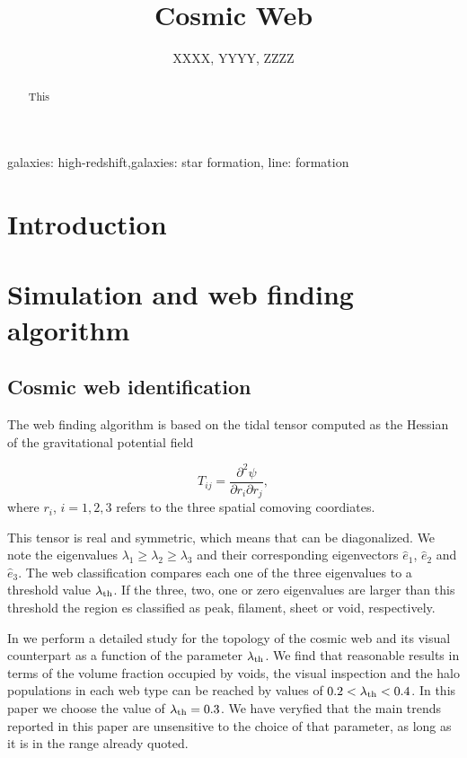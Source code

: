 \documentclass{emulateapj}
\begin{document}
\title{Cosmic Web} 
\author{
  XXXX,
  YYYY,
  ZZZZ
}

\begin{abstract}
This
\end{abstract}

\begin{keywords}
{galaxies: high-redshift,galaxies: star formation, line: formation}
\end{keywords}


\section{Introduction}
\label{sec:intro}

\section{Simulation and web finding algorithm}
\label{sec:Simulation}


\subsection{Cosmic web identification}
The web finding algorithm is based on the tidal tensor computed as the
Hessian of the  gravitational potential field

\begin{equation}
T_{ij} = \frac{\partial^2 \psi}{\partial r_i \partial r_j}, 
\end{equation}
where $r_{i}$, $i=1,2,3$ refers to the three spatial comoving
coordiates. 

This tensor is real and symmetric, which means that can be
diagonalized. We note the eigenvalues $\lambda_1\geq \lambda_2\geq
\lambda_3$ and their corresponding eigenvectors $\hat{e}_1$,
$\hat{e}_2$ and $\hat{e}_3$. The web classification compares each one
of the three eigenvalues to a threshold value $\lambda_{\rm th}$. If the three, two, one or zero eigenvalues are larger than this threshold the region es classified as peak, filament, sheet or void, respectively. 

In \cite{Tweb} we perform a detailed study for the topology of the
cosmic web and its visual counterpart as a function of the parameter
$\lambda_{\rm th}$. We find that reasonable results in terms of the
volume fraction occupied by voids, the visual inspection and the halo
populations in each web type can be reached by values of $0.2<\lambda_{\rm
th}<0.4$. In this paper we choose the value of $\lambda_{\rm
  th}=0.3$. We have veryfied that the main trends reported in this
paper are unsensitive to the choice of that parameter, as long as it
is in the range already quoted.
\end{document}
